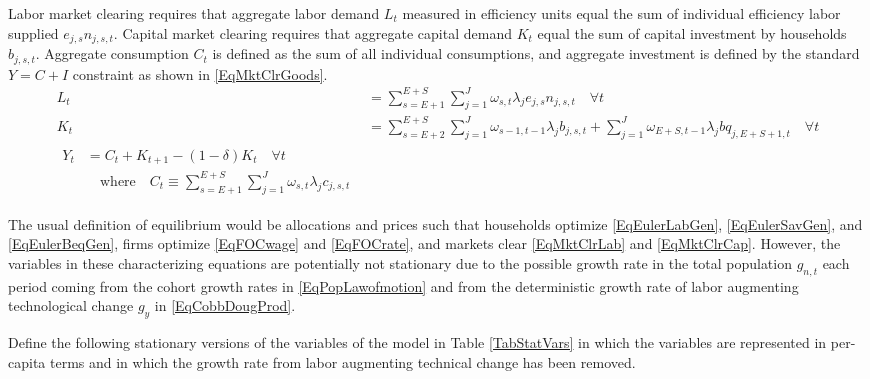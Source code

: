 \documentclass[letterpaper,12pt]{article}
\theoremstyle{definition}
\begin{document}
\begin{spacing}{1.5}
    Labor market clearing requires that aggregate labor demand $L_t$ measured in efficiency units equal the sum of individual efficiency labor supplied $e_{j,s}n_{j,s,t}$. Capital market clearing requires that aggregate capital demand $K_t$ equal the sum of capital investment by households $b_{j,s,t}$. Aggregate consumption $C_t$ is defined as the sum of all individual consumptions, and aggregate investment is defined by the standard $Y = C + I$ constraint as shown in \eqref{EqMktClrGoods}.
    \begin{align}
      L_t &= \sum_{s=E+1}^{E+S}\sum_{j=1}^{J} \omega_{s,t}\lambda_j e_{j,s}n_{j,s,t} \quad \forall t \label{EqMktClrLab} \\
      K_t &= \sum_{s=E+2}^{E+S}\sum_{j=1}^{J}\omega_{s-1,t-1}\lambda_j b_{j,s,t} + \sum_{j=1}^{J}\omega_{E+S,t-1}\lambda_j bq_{j,E+S+1,t} \quad \forall t \label{EqMktClrCap} \\
      \begin{split}
        Y_t &= C_t + K_{t+1} - (1-\delta)K_t \quad\forall t \\
        &\quad\text{where}\quad C_t \equiv \sum_{s=E+1}^{E+S}\sum_{j=1}^{J}\omega_{s,t}\lambda_j c_{j,s,t}
      \end{split} \label{EqMktClrGoods}
    \end{align}

    The usual definition of equilibrium would be allocations and prices such that households optimize \eqref{EqEulerLabGen}, \eqref{EqEulerSavGen}, and \eqref{EqEulerBeqGen}, firms optimize \eqref{EqFOCwage} and \eqref{EqFOCrate}, and markets clear \eqref{EqMktClrLab} and \eqref{EqMktClrCap}. However, the variables in these characterizing equations are potentially not stationary due to the possible growth rate in the total population $g_{n,t}$ each period coming from the cohort growth rates in \eqref{EqPopLawofmotion} and from the deterministic growth rate of labor augmenting technological change $g_y$ in \eqref{EqCobbDougProd}.

    Define the following stationary versions of the variables of the model in Table \ref{TabStatVars} in which the variables are represented in per-capita terms and in which the growth rate from labor augmenting technical change has been removed.


\end{spacing}
\end{document}
